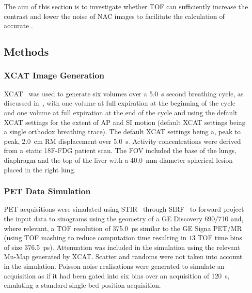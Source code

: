         The aim of this section is to investigate whether \gls{TOF} can sufficiently increase the contrast and lower the noise of \gls{NAC} images to facilitate the calculation of accurate .
        
        \subsection{Methods} \label{sec:impact_of_tof_on_respiratory_motion_model_estimation_using_pre_gated_no_intra_cycle_motion_nac_pet_methods}
            \subsubsection{XCAT Image Generation} \label{sec:impact_of_tof_on_respiratory_motion_model_estimation_using_pre_gated_no_intra_cycle_motion_nac_pet_methods_xcat_image_generation}
                \gls{XCAT}~ was used to generate six volumes over a \SI{5.0}{\second} second breathing cycle, as discussed in~, with one volume at full expiration at the beginning of the cycle and one volume at full expiration at the end of the cycle and using the default \gls{XCAT} settings for the extent of \gls{AP} and \gls{SI} motion (default \gls{XCAT} settings being a single orthodox breathing trace). The default \gls{XCAT} settings being a, peak to peak, \SI{2.0}{\centi\metre} \gls{RM} displacement over \SI{5.0}{\second}. Activity concentrations were derived from a static \gls{18F-FDG} patient scan. The \gls{FOV} included the base of the lungs, diaphragm and the top of the liver with a \SI{40.0}{\milli\metre} diameter spherical lesion placed in the right lung.
            
            \subsubsection{PET Data Simulation} \label{sec:impact_of_tof_on_respiratory_motion_model_estimation_using_pre_gated_no_intra_cycle_motion_nac_pet_methods_pet_data_simulation}
                \gls{PET} acquisitions were simulated using \gls{STIR}~ through \gls{SIRF}~ to forward project the input data to sinograms using the geometry of a \gls{GE} Discovery 690/710 and, where relevant, a \gls{TOF} resolution of \SI{375.0}{\pico\second} similar to the \gls{GE} Signa \gls{PET}/\gls{MR} (using \gls{TOF} mashing to reduce computation time resulting in $13$ \gls{TOF} time bins of size \SI{376.5}{\pico\second}). Attenuation was included in the simulation using the relevant \gls{Mu-Map} generated by \gls{XCAT}. Scatter and randoms were not taken into account in the simulation. Poisson noise realisations were generated to simulate an acquisition as if it had been gated into six bins over an acquisition of \SI{120}{\second}, emulating a standard single bed position acquisition. 
            
